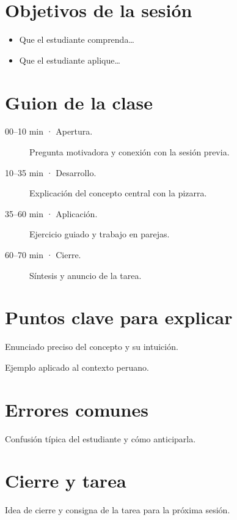 \documentclass{academic-report}
\begin{document}
\encabezado

\section{Objetivos de la sesión}
\begin{itemize}
  \item Que el estudiante comprenda\ldots
  \item Que el estudiante aplique\ldots
\end{itemize}

\section{Guion de la clase}
\begin{description}
  \item[00–10 min · Apertura.] Pregunta motivadora y conexión con la sesión previa.
  \item[10–35 min · Desarrollo.] Explicación del concepto central con la pizarra.
  \item[35–60 min · Aplicación.] Ejercicio guiado y trabajo en parejas.
  \item[60–70 min · Cierre.] Síntesis y anuncio de la tarea.
\end{description}

\section{Puntos clave para explicar}
\begin{definicion}
Enunciado preciso del concepto y su intuición.
\end{definicion}
\begin{ejemplo}
Ejemplo aplicado al contexto peruano.
\end{ejemplo}

\section{Errores comunes}
\begin{importante}
Confusión típica del estudiante y cómo anticiparla.
\end{importante}

\section{Cierre y tarea}
Idea de cierre y consigna de la tarea para la próxima sesión.
\end{document}
